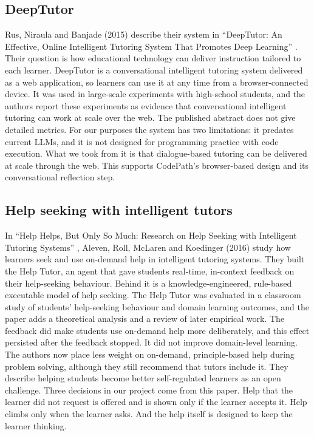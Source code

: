 \clearpage
\subsection{DeepTutor}
Rus, Niraula and Banjade (2015) describe their system in ``DeepTutor: An Effective, Online Intelligent Tutoring System That Promotes Deep Learning'' \cite{rus2015}. Their question is how educational technology can deliver instruction tailored to each learner. DeepTutor is a conversational intelligent tutoring system delivered as a web application, so learners can use it at any time from a browser-connected device. It was used in large-scale experiments with high-school students, and the authors report these experiments as evidence that conversational intelligent tutoring can work at scale over the web. The published abstract does not give detailed metrics. For our purposes the system has two limitations: it predates current LLMs, and it is not designed for programming practice with code execution. What we took from it is that dialogue-based tutoring can be delivered at scale through the web. This supports CodePath's browser-based design and its conversational reflection step.

\subsection{Help seeking with intelligent tutors}
In ``Help Helps, But Only So Much: Research on Help Seeking with Intelligent Tutoring Systems'' \cite{aleven2016}, Aleven, Roll, McLaren and Koedinger (2016) study how learners seek and use on-demand help in intelligent tutoring systems. They built the Help Tutor, an agent that gave students real-time, in-context feedback on their help-seeking behaviour. Behind it is a knowledge-engineered, rule-based executable model of help seeking. The Help Tutor was evaluated in a classroom study of students' help-seeking behaviour and domain learning outcomes, and the paper adds a theoretical analysis and a review of later empirical work. The feedback did make students use on-demand help more deliberately, and this effect persisted after the feedback stopped. It did not improve domain-level learning. The authors now place less weight on on-demand, principle-based help during problem solving, although they still recommend that tutors include it. They describe helping students become better self-regulated learners as an open challenge. Three decisions in our project come from this paper. Help that the learner did not request is offered and is shown only if the learner accepts it. Help climbs only when the learner asks. And the help itself is designed to keep the learner thinking.

